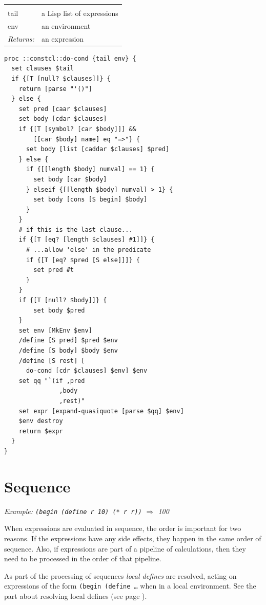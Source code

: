 \documentclass[twoside,9pt]{report}
\begin{document}
\noindent\begin{tabular}{ |p{1.9cm} p{8cm}| }
\hline
\rowcolor[HTML]{CCCCCC} \multicolumn{2}{|l|}{\bf do-cond (internal)} \\
tail & a Lisp list of expressions \\
env & an environment \\
\textit{Returns:} & an expression \\
\hline
\end{tabular}
\begin{lstlisting}
proc ::constcl::do-cond {tail env} {
  set clauses $tail
  if {[T [null? $clauses]]} {
    return [parse "'()"]
  } else {
    set pred [caar $clauses]
    set body [cdar $clauses]
    if {[T [symbol? [car $body]]] &&
        [[car $body] name] eq "=>"} {
      set body [list [caddar $clauses] $pred]
    } else {
      if {[[length $body] numval] == 1} {
        set body [car $body]
      } elseif {[[length $body] numval] > 1} {
        set body [cons [S begin] $body]
      }
    }
    # if this is the last clause...
    if {[T [eq? [length $clauses] #1]]} {
      # ...allow 'else' in the predicate
      if {[T [eq? $pred [S else]]]} {
        set pred #t
      }
    }
    if {[T [null? $body]]} {
        set body $pred
    }
    set env [MkEnv $env]
    /define [S pred] $pred $env
    /define [S body] $body $env
    /define [S rest] [
      do-cond [cdr $clauses] $env] $env
    set qq "`(if ,pred
               ,body
               ,rest)"
    set expr [expand-quasiquote [parse $qq] $env]
    $env destroy
    return $expr
  }
}
\end{lstlisting}
\section{Sequence}
\label{sequence}


\emph{Example: \texttt{(begin (define r 10) (* r r))} $\Rightarrow$ 100}


When expressions are evaluated in sequence, the order is important for two reasons. If the expressions have any side effects, they happen in the same order of sequence. Also, if expressions are part of a pipeline of calculations, then they need to be processed in the order of that pipeline.


As part of the processing of sequences \emph{local defines} are resolved, acting on expressions of the form \texttt{(begin (define \ldots } when in a local environment. See the part about resolving local defines (see page \pageref{resolving-local-defines}).
\end{document}
